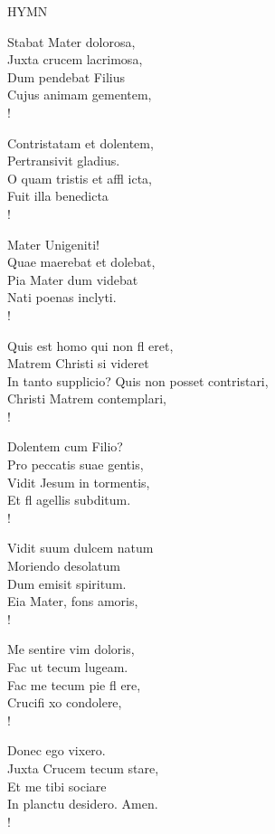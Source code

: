 \noindent\small{\uppercase{Hymn}}\normalsize\label{bvm:stabatmater}
\begin{cverse}
Stabat Mater dolorosa,\\
Juxta crucem lacrimosa,\\
Dum pendebat Filius\\
Cujus animam gementem,\\!

Contristatam et dolentem,\\
Pertransivit gladius.\\
O quam tristis et affl icta,\\
Fuit illa benedicta\\!

Mater Unigeniti!\\
Quae maerebat et dolebat,\\
Pia Mater dum videbat\\
Nati poenas inclyti.\\!

Quis est homo qui non fl eret,\\
Matrem Christi si videret\\
In tanto supplicio? Quis non posset contristari,\\
Christi Matrem contemplari,\\!

Dolentem cum Filio?\\
Pro peccatis suae gentis,\\
Vidit Jesum in tormentis,\\
Et fl agellis subditum.\\!

Vidit suum dulcem natum\\
Moriendo desolatum\\
Dum emisit spiritum.\\
Eia Mater, fons amoris,\\!

Me sentire vim doloris,\\
Fac ut tecum lugeam.\\
Fac me tecum pie fl ere,\\
Crucifi xo condolere,\\!

Donec ego vixero.\\
Juxta Crucem tecum stare,\\
Et me tibi sociare\\
In planctu desidero. Amen.\\!
\end{cverse}

